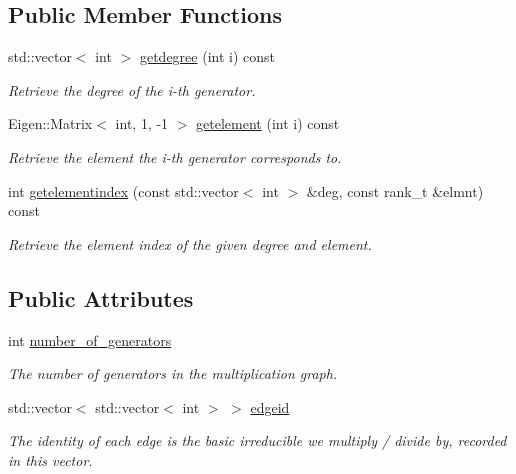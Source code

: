 \subsection*{Public Member Functions}
\begin{DoxyCompactItemize}
\item 
std\+::vector$<$ int $>$ \hyperlink{classMackey_1_1MultiplicationGraph_a1616acd79b92c94994648835a7941753}{getdegree} (int i) const
\begin{DoxyCompactList}\small\item\em Retrieve the degree of the i-\/th generator. \end{DoxyCompactList}\item 
Eigen\+::\+Matrix$<$ int, 1, -\/1 $>$ \hyperlink{classMackey_1_1MultiplicationGraph_acb5d06dd354041e4726a5aea5e11e847}{getelement} (int i) const
\begin{DoxyCompactList}\small\item\em Retrieve the element the i-\/th generator corresponds to. \end{DoxyCompactList}\item 
int \hyperlink{classMackey_1_1MultiplicationGraph_a2d76a0ac28dcead0d978ce6173b564f4}{getelementindex} (const std\+::vector$<$ int $>$ \&deg, const rank\+\_\+t \&elmnt) const
\begin{DoxyCompactList}\small\item\em Retrieve the element index of the given degree and element. \end{DoxyCompactList}\end{DoxyCompactItemize}
\subsection*{Public Attributes}
\begin{DoxyCompactItemize}
\item 
int \hyperlink{classMackey_1_1MultiplicationGraph_a9fd088a706e8c2ffeae3db1584de9266}{number\+\_\+of\+\_\+generators}
\begin{DoxyCompactList}\small\item\em The number of generators in the multiplication graph. \end{DoxyCompactList}\item 
std\+::vector$<$ std\+::vector$<$ int $>$ $>$ \hyperlink{classMackey_1_1MultiplicationGraph_aa0eb04947f664262233ed4cdf650371b}{edgeid}
\begin{DoxyCompactList}\small\item\em The identity of each edge is the basic irreducible we multiply / divide by, recorded in this vector. \end{DoxyCompactList}\end{DoxyCompactItemize}

